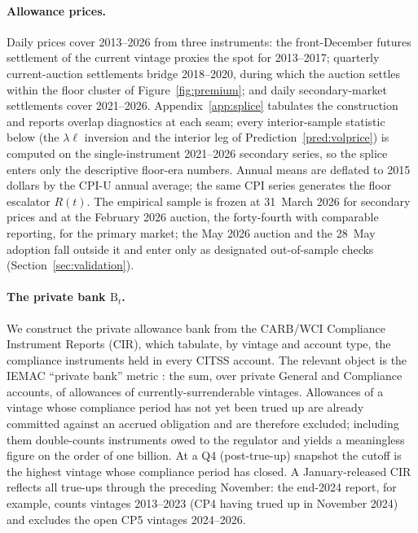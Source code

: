 \documentclass[11pt,letterpaper]{article}
\theoremstyle{plain}
\theoremstyle{definition}
\numberwithin{equation}{section}
\begin{document}
\paragraph{Allowance prices.} Daily prices cover 2013--2026 from three instruments: the front-December futures settlement of the current vintage proxies the spot for 2013--2017; quarterly current-auction settlements bridge 2018--2020, during which the auction settles within the floor cluster of Figure~\ref{fig:premium}; and daily secondary-market settlements cover 2021--2026. Appendix~\ref{app:splice} tabulates the construction and reports overlap diagnostics at each seam; every interior-sample statistic below (the $\lambda\ell$ inversion and the interior leg of Prediction~\ref{pred:volprice}) is computed on the single-instrument 2021--2026 secondary series, so the splice enters only the descriptive floor-era numbers. Annual means are deflated to 2015 dollars by the CPI-U annual average; the same CPI series generates the floor escalator $R(t)$. The empirical sample is frozen at 31~March 2026 for secondary prices and at the February 2026 auction, the forty-fourth with comparable reporting, for the primary market; the May 2026 auction and the 28~May adoption fall outside it and enter only as designated out-of-sample checks (Section~\ref{sec:validation}).
 
\paragraph{The private bank \texorpdfstring{\(\mathrm{B}_t\)}{B_t}.} We construct the private allowance bank from the CARB/WCI Compliance Instrument Reports (CIR), which tabulate, by vintage and account type, the compliance instruments held in every CITSS account. The relevant object is the IEMAC ``private bank'' metric \citep{cullenward2019banking, iemac2021}: the sum, over private General and Compliance accounts, of allowances of currently-surrenderable vintages. Allowances of a vintage whose compliance period has not yet been trued up are already committed against an accrued obligation and are therefore excluded; including them double-counts instruments owed to the regulator and yields a meaningless figure on the order of one billion. At a Q4 (post-true-up) snapshot the cutoff is the highest vintage whose compliance period has closed. A January-released CIR reflects all true-ups through the preceding November: the end-2024 report, for example, counts vintages 2013--2023 (CP4 having trued up in November 2024) and excludes the open CP5 vintages 2024--2026.
\end{document}
